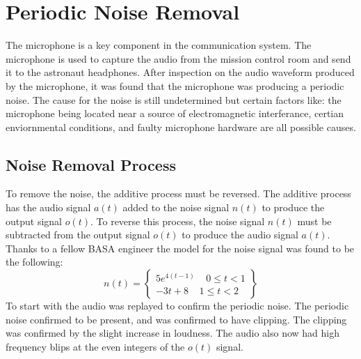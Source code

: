\documentclass{article}
\begin{document}
\section{Periodic Noise Removal}
The microphone is a key component in the communication system. The microphone is used to capture the audio from the mission control room and send it to the astronaut headphones. After inspection on the audio waveform produced by the microphone, it was found that the microphone was producing a periodic noise. The cause for the noise is still undetermined but certain factors like: the microphone being located near a source of electromagnetic interferance, certian enviornmental conditions, and faulty microphone hardware are all possible causes.
\subsection{Noise Removal Process}
To remove the noise, the additive process must be reversed. The additive process has the audio signal $a(t)$ added to the noise signal $n(t)$ to produce the output signal $o(t)$. To reverse this process, the noise signal $n(t)$ must be subtracted from the output signal $o(t)$ to produce the audio signal $a(t)$. Thanks to a fellow BASA engineer the model for the noise signal was found to be the following:
\begin{equation}
    n(t) =
    \left\{
        \begin{array}{lr}
            5e^{4(t-1)}\;\;\;\; 0 \leq t < 1\\
            -3t + 8\;\;\;\; 1 \leq t < 2
        \end{array}
    \right\}
    \end{equation}
To start with the audio was replayed to confirm the periodic noise. The periodic noise confirmed to be present, and was confirmed to have clipping. The clipping was confirmed by the slight increase in loudness. The audio also now had high frequency blips at the even integers of the $o(t)$ signal.
\end{document}
